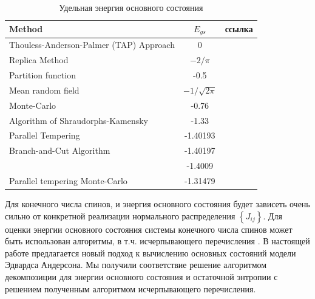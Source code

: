 \documentclass[utf8, babel, sor, jor, amsmath, amssymb, reprint]{elsarticle} %
\begin{document}
\begin{table}[!h]
	\begin{tabular}{|l|c|l|}
		\hline
		Method                                   & $E_{gs}$                                       & ссылка                                          \\ \hline
		Thouless-Anderson-Palmer (TAP) Approach & 0                                              & \cite{thouless1977solution}    \\ \hline
		Replica Method                            & $-2/\pi$                                       & \cite{sherrington1975solvable} \\ \hline
		Partition function                      & -0.5                                           & \cite{tanaka1980analytic}      \\ \hline
		Mean random field                       & $-1/\sqrt{2\pi}$                               & \cite{klein1976comparison}     \\ \hline
		Monte-Carlo                             & -0.76                                          & \cite{kirkpatrick1978infinite} \\ \hline
		Algorithm of Shraudorphs-Kamensky        & -1.33                                          & \cite{karandashev2019global}   \\ \hline
		Parallel Tempering   & -1.40193                                       & \cite{palmer1999ground}        \\ \hline
		  Branch-and-Cut Algorithm              & -1.40197                         
		                                        & \cite{campbell2004energy}      \\ \hline
		                                        & -1.4009                                        & \cite{roma2009ground}          \\ \hline
		Parallel tempering Monte-Carlo  & -1.31479                                       & \cite{roma2009ground}          \\ \hline
	\end{tabular}
	\label{tab:Egs}
	\caption{Удельная энергия основного состояния}
\end{table}

Для конечного числа спинов, и энергия основного состояния будет зависеть очень сильно от конкретной реализации нормального распределения $\left\lbrace J_{ij} \right\rbrace $. Для оценки энергии основного состояния системы конечного числа спинов может быть использован алгоритмы, в т.ч. исчерпывающего перечисления \cite{padalko2021parallel}. В настоящей работе предлагается новый подход к вычислению основных состояний модели Эдвардса Андерсона. Мы получили соответствие решение алгоритмом декомпозиции для энергии основного состояния и остаточной энтропии с решением полученным алгоритмом исчерпывающего перечисления.  
\end{document}
